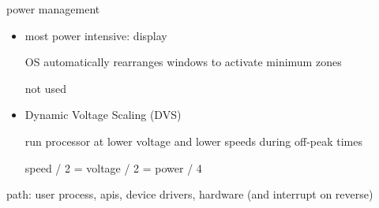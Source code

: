 \documentclass[11pt]{article}
\begin{document}
power management
\begin{itemize}
    \item most power intensive: display

        OS automatically rearranges windows to activate minimum zones

        not used

    \item Dynamic Voltage Scaling (DVS)

        run processor at lower voltage and lower speeds during off-peak times

        speed / 2 = voltage / 2 = power / 4
\end{itemize}

path: user process, apis, device drivers, hardware (and interrupt on reverse)
\end{document}

